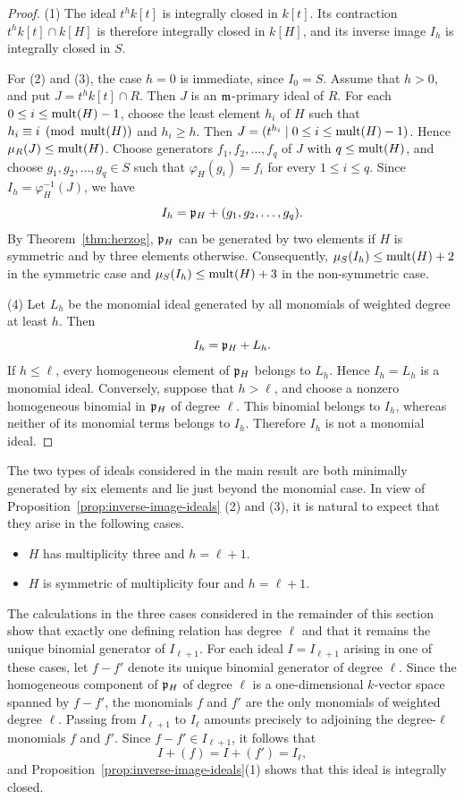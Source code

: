 \begin{proof}
(1) The ideal $t^hk[t]$ is integrally closed in $k[t]$.  Its contraction
$t^hk[t]\cap k[H]$ is therefore integrally closed in $k[H]$, and its inverse
image $I_h$ is integrally closed in $S$.


For (2) and (3), the case $h=0$ is immediate, since $I_0=S$. Assume that $h>0$, and put $J=t^hk[t]\cap R$. Then $J$ is an $\mathfrak{m}$-primary ideal of $R$.  For each $0 \le i \le \operatorname{mult}(H)-1$, choose the least element $h_i$ of $H$ such that $h_i \equiv i \pmod{\operatorname{mult}(H)}$ and $h_i \ge h$.  Then $J=(t^{h_i} \mid 0 \le i \le \operatorname{mult}(H)-1)$. Hence $\mu_R(J)\leq\operatorname{mult}(H)$.
Choose generators $f_1,f_2,\ldots,f_q$ of $J$ with $q\leq\operatorname{mult}(H)$, and choose $g_1,g_2,\ldots,g_q\in S$ such that $\varphi_H(g_i)=f_i$ for every $1\leq i\leq q$.  Since $I_h=\varphi_H^{-1}(J)$, we have
\[
 I_h=\mathfrak{p}_H+(g_1, g_2, \ldots , g_q).
\]
By Theorem~\ref{thm:herzog}, $\mathfrak{p}_H$ can be generated by two elements if $H$ is symmetric and by three elements otherwise.  Consequently, $\mu_S(I_h)\leq\operatorname{mult}(H)+2$ in the symmetric case and $\mu_S(I_h)\leq\operatorname{mult}(H)+3$ in the non-symmetric case.


(4) Let $L_h$ be the monomial ideal generated by all monomials of weighted degree
at least $h$.  Then
\[
 I_h=\mathfrak{p}_H+L_h.
\]
If $h\leq\ell$, every homogeneous element of $\mathfrak{p}_H$ belongs to $L_h$.
Hence $I_h=L_h$ is a monomial ideal.
Conversely, suppose that $h>\ell$, and choose a nonzero homogeneous binomial in $\mathfrak{p}_H$ of degree $\ell$.  This binomial belongs to $I_h$, whereas neither of its monomial terms belongs to $I_h$.  Therefore $I_h$ is not a monomial ideal.
\end{proof}


The two types of ideals considered in the main result are both minimally generated by six elements and lie just beyond the monomial case.
In view of Proposition~\ref{prop:inverse-image-ideals} (2) and (3), it is natural to expect that they arise in the following cases.

\begin{itemize}
	\item $H$ has multiplicity three and $h=\ell+1$.
	\item $H$ is symmetric of multiplicity four and $h=\ell+1$.
\end{itemize}

The calculations in the three cases considered in the remainder of this
section show that exactly one defining relation has degree \(\ell\) and that
it remains the unique binomial generator of $I_{\ell+1}$.
For each ideal $I=I_{\ell+1}$ arising in one of these cases, let $f-f'$ denote its unique binomial generator of degree $\ell$.  Since the homogeneous component of $\mathfrak{p}_H$ of degree $\ell$ is a one-dimensional $k$-vector space spanned by $f-f'$, the monomials $f$ and $f'$ are the only monomials of weighted degree $\ell$.  Passing from $I_{\ell+1}$ to $I_\ell$ amounts precisely to adjoining the degree-$\ell$ monomials $f$ and $f'$.  Since $f-f'\in I_{\ell+1}$, it follows that
$$
I+(f)=I+(f')=I_\ell,
$$
and Proposition~\ref{prop:inverse-image-ideals}(1) shows that this ideal is integrally closed.

